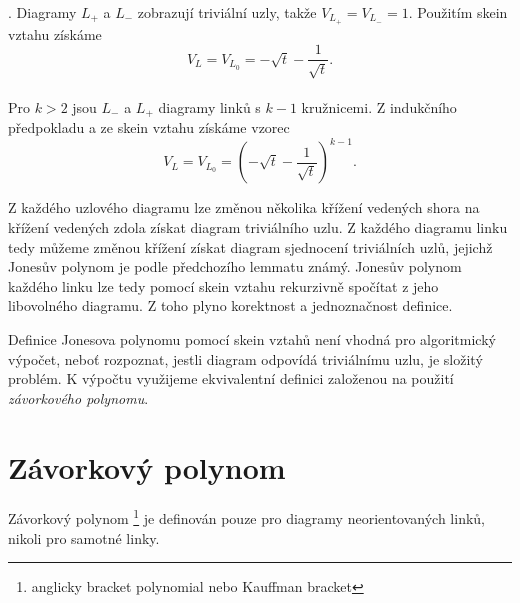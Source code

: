 \begin{dukaz}
. Diagramy $L_+$ a $L_-$ zobrazují triviální uzly, takže $V_{L_+} = V_{L_-} = 1$. Použitím skein vztahu získáme $$V_ L = V_{L_0} = - \sqrt{t} -\frac{1}{\sqrt{t}} .$$ \\
Pro $k > 2$ jsou $L_-$ a $L_+ $ diagramy linků s $k-1$ kružnicemi. Z indukčního předpokladu a ze skein vztahu získáme vzorec $$V_ L = V_{L_0} = \left(- \sqrt{t} -\frac{1}{\sqrt{t}}\right) ^{k-1}.$$
\end{dukaz}  

\begin{pozn}
Z každého uzlového diagramu lze změnou několika křížení vedených shora na křížení vedených zdola získat diagram triviálního uzlu. Z každého diagramu linku tedy můžeme změnou křížení získat diagram sjednocení triviálních uzlů, jejichž Jonesův polynom je podle předchozího lemmatu známý. Jonesův polynom každého linku lze tedy pomocí skein vztahu rekurzivně spočítat z jeho libovolného diagramu. Z toho plyno korektnost a jednoznačnost definice.
\end{pozn}


Definice Jonesova polynomu pomocí skein vztahů není vhodná pro algoritmický výpočet, neboť rozpoznat, jestli diagram odpovídá triviálnímu uzlu, je složitý problém. K výpočtu využijeme ekvivalentní definici založenou na použití \emph{závorkového polynomu}.

\section{Závorkový polynom}
Závorkový polynom \footnote{anglicky bracket polynomial nebo Kauffman bracket} je definován pouze pro diagramy neorientovaných linků, nikoli pro samotné linky.

